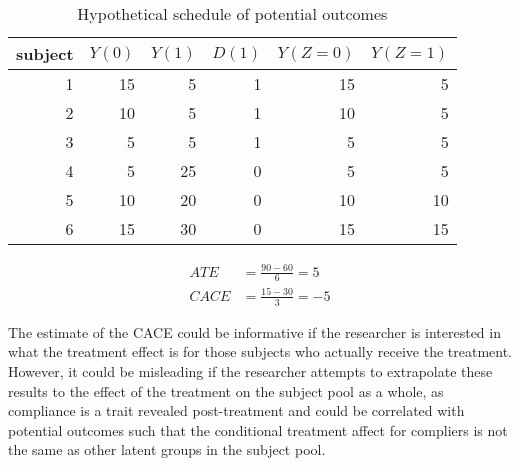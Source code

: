 \documentclass[11pt,notitlepage]{article}\usepackage[]{graphicx}\usepackage[]{color}
\begin{document}
\begin{table}[htbp]
  \centering
  \caption{Hypothetical schedule of potential outcomes}
    \begin{tabular}{rrrrrr}
    \toprule
    subject & $Y(0)$  & $Y(1)$  & $D(1)$  & $Y(Z=0)$ & $ Y(Z=1) $\\
    \midrule
    1     & 15    & 5     & 1     & 15    & 5 \\
    2     & 10    & 5     & 1     & 10    & 5 \\
    3     & 5     & 5     & 1     & 5     & 5 \\
    4     & 5     & 25    & 0     & 5     & 5 \\
    5     & 10    & 20    & 0     & 10    & 10 \\
    6     & 15    & 30    & 0     & 15    & 15 \\
    \bottomrule
    \end{tabular}%
  \label{tab:addlabel}%
\end{table}%

\begin{align*}
ATE &= \frac{90 - 60}{6} = 5\\
CACE  &= \frac{15 - 30}{3} = -5
\end{align*}

The estimate of the CACE could be informative if the researcher is interested in what the treatment effect is for those subjects who actually receive the treatment. However, it could be misleading if the researcher attempts to extrapolate these results to the effect of the treatment on the subject pool as a whole, as compliance is a trait revealed post-treatment and could be correlated with potential outcomes such that the conditional treatment affect for compliers is not the same as other latent groups in the subject pool.
\end{document}
